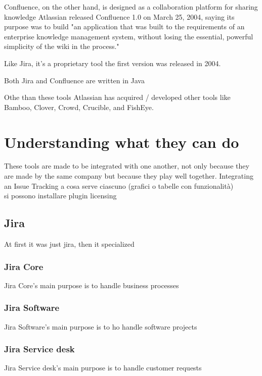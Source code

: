 Confluence, on the other hand, is designed as a collaboration platform for sharing knowledge
Atlassian released Confluence 1.0 on March 25, 2004, saying its purpose was to build "an application that was built to the requirements of an enterprise knowledge management system, without losing the essential, powerful simplicity of the wiki in the process."

Like Jira, it's a proprietary tool the first version was released in 2004.

Both Jira and Confluence are written in Java

Othe than these tools Atlassian has acquired / developed other tools like Bamboo, Clover, Crowd, Crucible, and FishEye.

\section{Understanding what they can do}
These tools are made to be integrated with one another, not only because they are made by the same company but because they play well together.
Integrating an Issue Tracking
a cosa serve ciascuno (grafici o tabelle con funzionalità)\\
si possono installare plugin
licensing

	\subsection{Jira}
	
		At first it was just jira, then it specialized
	
		\subsubsection{Jira Core}
			Jira Core's main purpose is to handle business processes 
			
		\subsubsection{Jira Software}
			Jira Software's main purpose is to ho handle software projects
		
		\subsubsection{Jira Service desk}
			Jira Service desk's main purpose is to handle customer requests

